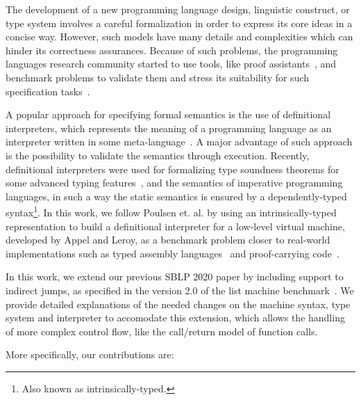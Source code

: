 \documentclass[review]{elsarticle}
\theoremstyle{definition}
\begin{document}
The development of a new programming language design, linguistic construct,
or type system involves a careful formalization in order to express
its core ideas in a concise way. However, such models have many details
and complexities which can hinder its correctness assurances.
Because of such problems, the programming languages research community
started to use tools, like proof assistants~\cite{Stump16,Chlipala13},
and benchmark problems to validate them and stress its suitability for
such specification tasks~\cite{Aydemir05,Pientka18,Appel07}.

A popular approach for specifying formal semantics is the
use of definitional interpreters, which represents the meaning of a
programming language as an interpreter written in some
meta-language~\cite{Reynolds72}. A major advantage of such approach
is the possibility to validate the semantics through execution.
Recently, definitional interpreters were used for formalizing type
soundness theorems for some advanced typing features~\cite{Amin17},
and the semantics of imperative programming languages, in such a way the static
semantics is ensured by a dependently-typed
syntax\footnote{Also known as intrinsically-typed.}\cite{Poulsen18}.
In this work, we follow Poulsen et. al. by using an intrinsically-typed
representation to build a definitional interpreter for a low-level virtual
machine, developed by Appel and Leroy, as a benchmark problem closer to
real-world implementations such as typed assembly languages~\cite{CraryM99} and
proof-carrying code~\cite{Necula97}.

In this work, we extend our previous SBLP 2020 paper by including support to
indirect jumps, as specified in the version 2.0 of the list
machine benchmark~\cite{AppelDL12}. We provide detailed explanations of the needed
changes on the machine syntax, type system and interpreter to accomodate this extension, which
allows the handling of more complex control flow, like the call/return model of function calls.

More specifically, our contributions are:
\end{document}
